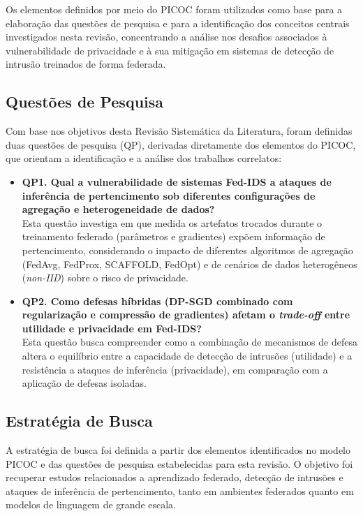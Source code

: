 \documentclass[
	12pt,				%
	openright,			%
	oneside,			%
	a4paper,			%
	english,			%
	french,				%
	spanish,			%
	brazil,				%
	]{abntex2}
\begin{document}
Os elementos definidos por meio do PICOC foram utilizados como base para a elaboração das questões de pesquisa e para a identificação dos conceitos centrais investigados nesta revisão, concentrando a análise nos desafios associados à vulnerabilidade de privacidade e à sua mitigação em sistemas de detecção de intrusão treinados de forma federada.

\subsection{Questões de Pesquisa}

Com base nos objetivos desta Revisão Sistemática da Literatura, foram definidas duas questões de pesquisa (QP), derivadas diretamente dos elementos do PICOC, que orientam a identificação e a análise dos trabalhos correlatos:

\begin{itemize}
    \item \textbf{QP1. Qual a vulnerabilidade de sistemas Fed-IDS a ataques de inferência de pertencimento sob diferentes configurações de agregação e heterogeneidade de dados?} \\
    Esta questão investiga em que medida os artefatos trocados durante o treinamento federado (parâmetros e gradientes) expõem informação de pertencimento, considerando o impacto de diferentes algoritmos de agregação (FedAvg, FedProx, SCAFFOLD, FedOpt) e de cenários de dados heterogêneos (\textit{non-IID}) sobre o risco de privacidade.

    \item \textbf{QP2. Como defesas híbridas (DP-SGD combinado com regularização e compressão de gradientes) afetam o \textit{trade-off} entre utilidade e privacidade em Fed-IDS?} \\
    Esta questão busca compreender como a combinação de mecanismos de defesa altera o equilíbrio entre a capacidade de detecção de intrusões (utilidade) e a resistência a ataques de inferência (privacidade), em comparação com a aplicação de defesas isoladas.
\end{itemize}

\subsection{Estratégia de Busca}

A estratégia de busca foi definida a partir dos elementos identificados no modelo PICOC e das questões de pesquisa estabelecidas para esta revisão. O objetivo foi recuperar estudos relacionados a aprendizado federado, detecção de intrusões e ataques de inferência de pertencimento, tanto em ambientes federados quanto em modelos de linguagem de grande escala.
\end{document}
